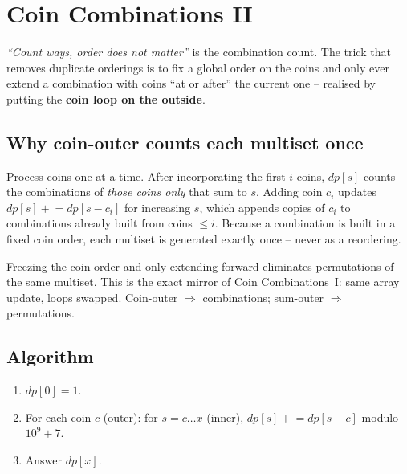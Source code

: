 \section{Coin Combinations II}
\label{sec:cses-coin-combinations-ii}


\begin{patternbox}
\emph{``Count ways, order does not matter''} is the combination count.
The trick that removes duplicate orderings is to fix a global order on
the coins and only ever extend a combination with coins ``at or after''
the current one -- realised by putting the \textbf{coin loop on the
outside}.
\end{patternbox}

\subsection*{Why coin-outer counts each multiset once}

Process coins one at a time. After incorporating the first $i$ coins,
$\textit{dp}[s]$ counts the combinations of \emph{those coins only} that
sum to $s$. Adding coin $c_i$ updates
$\textit{dp}[s]\mathrel{+}=\textit{dp}[s-c_i]$ for increasing $s$, which
appends copies of $c_i$ to combinations already built from coins
$\le i$. Because a combination is built in a fixed coin order, each
multiset is generated exactly once -- never as a reordering.

\begin{ideabox}
Freezing the coin order and only extending forward eliminates permutations
of the same multiset. This is the exact mirror of Coin Combinations~I:
same array update, loops swapped. Coin-outer $\Rightarrow$ combinations;
sum-outer $\Rightarrow$ permutations.
\end{ideabox}

\subsection*{Algorithm}

\begin{enumerate}
  \item $\textit{dp}[0]=1$.
  \item For each coin $c$ (outer): for $s=c\ldots x$ (inner),
        $\textit{dp}[s]\mathrel{+}=\textit{dp}[s-c]$ modulo $10^9+7$.
  \item Answer $\textit{dp}[x]$.
\end{enumerate}

